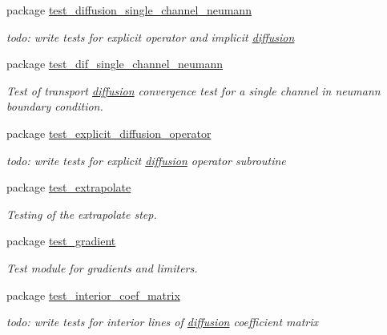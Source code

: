 \begin{CompactItemize}
\item 
package \hyperlink{a00087}{test\_\-diffusion\_\-single\_\-channel\_\-neumann}
\begin{CompactList}\small\item\em todo: write tests for explicit operator and implicit \hyperlink{a00058}{diffusion} \item\end{CompactList}

\item 
package \hyperlink{a00082}{test\_\-dif\_\-single\_\-channel\_\-neumann}
\begin{CompactList}\small\item\em Test of transport \hyperlink{a00058}{diffusion} convergence test for a single channel in neumann boundary condition. \item\end{CompactList}

\item 
package \hyperlink{a00088}{test\_\-explicit\_\-diffusion\_\-operator}
\begin{CompactList}\small\item\em todo: write tests for explicit \hyperlink{a00058}{diffusion} operator subroutine \item\end{CompactList}

\item 
package \hyperlink{a00089}{test\_\-extrapolate}
\begin{CompactList}\small\item\em Testing of the extrapolate step. \item\end{CompactList}

\item 
package \hyperlink{a00090}{test\_\-gradient}
\begin{CompactList}\small\item\em Test module for gradients and limiters. \item\end{CompactList}

\item 
package \hyperlink{a00091}{test\_\-interior\_\-coef\_\-matrix}
\begin{CompactList}\small\item\em todo: write tests for interior lines of \hyperlink{a00058}{diffusion} coefficient matrix \item\end{CompactList}


\end{CompactItemize}

